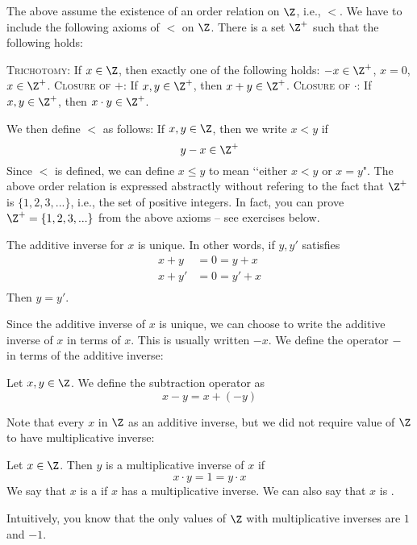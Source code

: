 The above assume the existence of an order relation on $\Z$, i.e., $<$.
We have to include the following axioms of $<$ on $\Z$.
There is a set $\Z^+$ such that the following holds:
\begin{enumerate}[nosep]
  \li \textsc{Trichotomy}: If $x \in \Z$, then exactly one of the following holds:
  $-x \in \Z^+$, $x = 0$, $x \in \Z^+$.
  \li \textsc{Closure of $+$}: If $x,y \in \Z^+$, then $x + y \in \Z^+$.
  \li \textsc{Closure of $\cdot$}: If $x,y \in \Z^+$, then $x \cdot y \in \Z^+$.
\end{enumerate}
We then define $<$ as follows: If $x, y \in \Z$, then we write $x < y$ if
\[
y - x \in \Z^+
\]
Since $<$ is defined, we can define $x \leq y$ to mean \lq\lq either $x < y$
or $x = y$".
The above order relation is expressed abstractly without refering to the fact that
$\Z^+$ is $\{1, 2, 3, ...\}$, i.e., the set of positive integers.
In fact, you can prove $\Z^+ = \{1, 2, 3, ...\}$ from the above axioms --
see exercises below.

\begin{prop}
  The additive inverse for $x$ is unique.
  In other words, if $y, y'$ satisfies
  \begin{align*}
    x + y &= 0 = y + x \\
    x + y' &= 0 = y' + x \\
  \end{align*}
  Then $y = y'$.
\end{prop}

Since the additive inverse of $x$ is unique, we can choose to write
the additive inverse of $x$ in terms of $x$.
This is usually written $-x$.
We define the operator $-$ in terms of the additive inverse:

\begin{defn}
  Let $x,y \in \Z$. We define the subtraction operator as
  \[
  x - y = x + (-y)
  \]
\end{defn}

Note that every $x$ in $\Z$ as an additive inverse, but we did not
require value of $\Z$ to have multiplicative inverse:

\begin{defn}
  Let $x \in \Z$. Then $y$ is a multiplicative inverse of $x$ if
  \[
  x\cdot y = 1 = y\cdot x
  \]
  We say that $x$ is a  if $x$ has a multiplicative inverse.
  We can also say that $x$ is .
\end{defn}

Intuitively, you know that the only values of $\Z$ with multiplicative inverses
are $1$ and $-1$.

